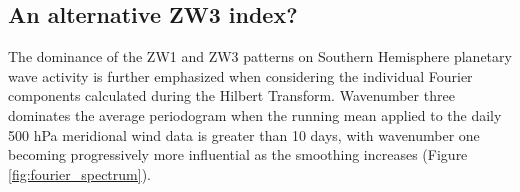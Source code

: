 \subsection{An alternative ZW3 index?}

The dominance of the ZW1 and ZW3 patterns on Southern Hemisphere planetary wave activity is further emphasized when considering the individual Fourier components calculated during the Hilbert Transform. Wavenumber three dominates the average periodogram when the running mean applied to the daily 500 hPa meridional wind data is greater than 10 days, with wavenumber one becoming progressively more influential as the smoothing increases (Figure \ref{fig:fourier_spectrum}).